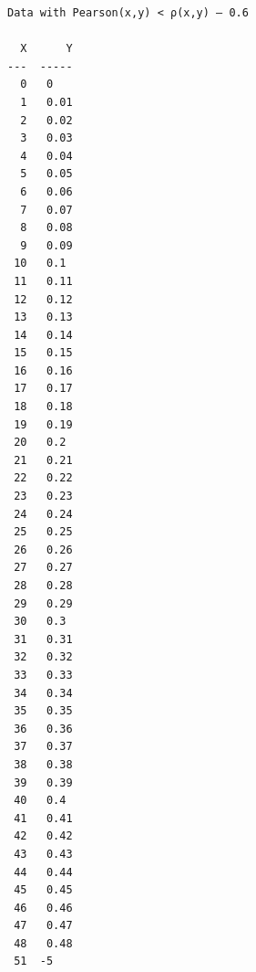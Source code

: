 \documentclass[11pt]{article}
\begin{document}
    \begin{Verbatim}[commandchars=\\\{\}]
Data with Pearson(x,y) < ρ(x,y) – 0.6

  X      Y
---  -----
  0   0
  1   0.01
  2   0.02
  3   0.03
  4   0.04
  5   0.05
  6   0.06
  7   0.07
  8   0.08
  9   0.09
 10   0.1
 11   0.11
 12   0.12
 13   0.13
 14   0.14
 15   0.15
 16   0.16
 17   0.17
 18   0.18
 19   0.19
 20   0.2
 21   0.21
 22   0.22
 23   0.23
 24   0.24
 25   0.25
 26   0.26
 27   0.27
 28   0.28
 29   0.29
 30   0.3
 31   0.31
 32   0.32
 33   0.33
 34   0.34
 35   0.35
 36   0.36
 37   0.37
 38   0.38
 39   0.39
 40   0.4
 41   0.41
 42   0.42
 43   0.43
 44   0.44
 45   0.45
 46   0.46
 47   0.47
 48   0.48
 51  -5

    \end{Verbatim}

    \begin{center}
    \end{center}
    { \hspace*{\fill} \\}
    
\end{document}

